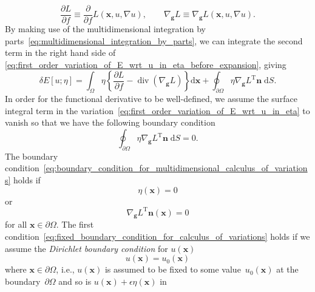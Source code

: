\documentclass[12pt,a4paper]{article}
\begin{document}
\begin{equation}
\frac{\partial L}{\partial f} \equiv
\frac{\partial}{\partial f} L\left(\mathbf{x}, u, \nabla u\right) , \qquad
\nabla_{\mathbf{g}} L \equiv 
\nabla_{\mathbf{g}} L\left(\mathbf{x}, u, \nabla u\right) .
\end{equation}
By making use of
the multidimensional integration by parts~\eqref{eq:multidimensional_integration_by_parts},
we can integrate the second term in the right hand side of
\eqref{eq:first_order_variation_of_E_wrt_u_in_eta_before_expansion}, giving
\begin{equation}
\delta E[u; \eta] =
\int_{\Omega} \eta \left\{
\frac{\partial L}{ \partial f} - \operatorname{div}\left( \nabla_{\mathbf{g}} L \right)
\right\} \mathrm{d}\mathbf{x} +
\oint_{\partial\Omega} \eta {\nabla_{\mathbf{g}} L}^{\operatorname{T}} \mathbf{n} \; \mathrm{d}S .
\label{eq:first_order_variation_of_E_wrt_u_in_eta}
\end{equation}
In order for the functional derivative to be well-defined,
we assume the surface integral term in
the variation~\eqref{eq:first_order_variation_of_E_wrt_u_in_eta} to vanish so that
we have the following boundary condition
\begin{equation}
\oint_{\partial\Omega} \eta {\nabla_{\mathbf{g}} L}^{\operatorname{T}} \mathbf{n} \; \mathrm{d}S
= 0.
\label{eq:boundary_condition_for_multidimensional_calculus_of_variations}
\end{equation}
The boundary condition~\eqref{eq:boundary_condition_for_multidimensional_calculus_of_variations}
holds if
\begin{equation}
\eta(\mathbf{x}) = 0
\label{eq:fixed_boundary_condition_for_calculus_of_variations}
\end{equation}
or 
\begin{equation}
{\nabla_{\mathbf{g}} L}^{\operatorname{T}} \mathbf{n}(\mathbf{x}) = 0
\label{eq:derivative_boundary_condition_for_calculus_of_variations}
\end{equation}
for all $\mathbf{x} \in \partial\Omega$.
The first condition~\eqref{eq:fixed_boundary_condition_for_calculus_of_variations} holds
if we assume the \emph{Dirichlet boundary condition} for $u(\mathbf{x})$
\begin{equation}
u(\mathbf{x}) = u_0(\mathbf{x})
\label{eq:Dirichlet_boundary_condition}
\end{equation}
where $\mathbf{x} \in \partial\Omega$, i.e.,
$u(\mathbf{x})$ is assumed to be fixed to some value~$u_0(\mathbf{x})$
at the boundary~$\partial\Omega$ and
so is $u(\mathbf{x}) + \epsilon\eta(\mathbf{x})$ in
\end{document}
